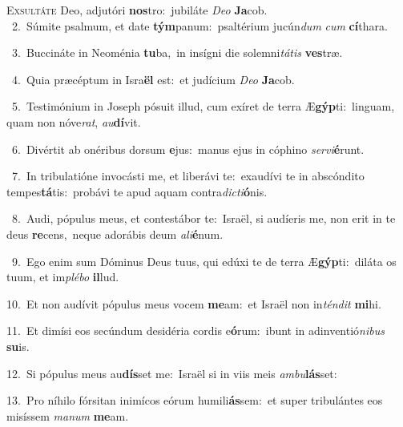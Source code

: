 \lettrine{\initial\textcolor{\initialcolor}{E}}{xsultáte} Deo, adjutóri \textbf{nos}\-tro:~\star jubiláte \textit{De}\-\textit{o} \textbf{Ja}\-cob.\\
{\numbfont\textcolor{\numbcolor}{~2.}}~Súmite psalmum, et date \textbf{tým}\-panum:~\star psaltérium jucún\textit{dum} \textit{cum} \textbf{cí}\-thara.\par
{\numbfont\textcolor{\numbcolor}{~3.}}~Buccináte in Neoménia \textbf{tu}\-ba,~\star in insígni die solemni\-\textit{tá}\-\textit{tis} \textbf{ves}\-træ.\par
{\numbfont\textcolor{\numbcolor}{~4.}}~Quia præcéptum in Isra\textbf{ël} est:~\star et judícium \textit{De}\-\textit{o} \textbf{Ja}\-cob.\par
{\numbfont\textcolor{\numbcolor}{~5.}}~Testimónium in Joseph pósuit illud, cum exíret de terra Æ\-\textbf{gýp}\-ti:~\star linguam, quam non nóve\-\textit{rat}\-, \textit{au}\-\textbf{dí}vit.\par
{\numbfont\textcolor{\numbcolor}{~6.}}~Divértit ab onéribus dorsum \textbf{e}\-jus:~\star manus ejus in cóphino \textit{ser}\-\textit{vi}\textbf{é}runt.\par
{\numbfont\textcolor{\numbcolor}{~7.}}~In tribulatióne invocásti me, et liberávi te:~\dagger exaudívi te in abscóndito tempes\-\textbf{tá}\-tis:~\star probávi te apud aquam contra\-\textit{dic}\-\textit{ti}\textbf{ó}nis.\par
{\numbfont\textcolor{\numbcolor}{~8.}}~Audi, pópulus meus, et contestábor te:~\dagger Israël, si audíeris me, non erit in te deus \textbf{re}\-cens,~\star neque adorábis deum \textit{a}\-\textit{li}\textbf{é}num.\par
{\numbfont\textcolor{\numbcolor}{~9.}}~Ego enim sum Dóminus Deus tuus, qui edúxi te de terra Æ\-\textbf{gýp}\-ti:~\star diláta os tuum, et im\-\textit{plé}\-\textit{bo} \textbf{il}\-lud.\par
{\numbfont\textcolor{\numbcolor}{10.}}~Et non audívit pópulus meus vocem \textbf{me}\-am:~\star et Israël non in\-\textit{tén}\-\textit{dit} \textbf{mi}\-hi.\par
{\numbfont\textcolor{\numbcolor}{11.}}~Et dimísi eos secúndum desidéria cordis e\-\textbf{ó}\-rum:~\star ibunt in adinventió\-\textit{ni}\-\textit{bus} \textbf{su}\-is.\par
{\numbfont\textcolor{\numbcolor}{12.}}~Si pópulus meus au\-\textbf{dís}\-set me:~\star Israël si in viis meis \textit{am}\-\textit{bu}\textbf{lás}set:\par
{\numbfont\textcolor{\numbcolor}{13.}}~Pro níhilo fórsitan inimícos eórum humili\-\textbf{ás}\-sem:~\star et super tribulántes eos misíssem \textit{ma}\-\textit{num} \textbf{me}\-am.\par
